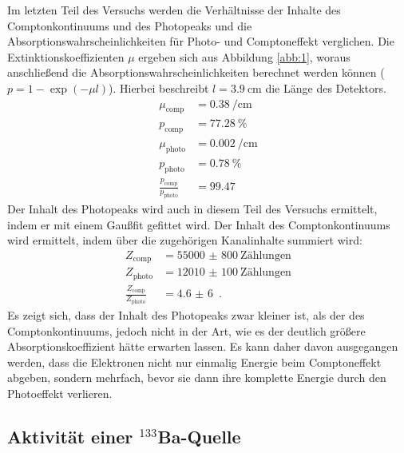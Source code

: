 \noindent Im letzten Teil des Versuchs werden die Verhältnisse der Inhalte des Comptonkontinuums und des Photopeaks und die Absorptionswahrscheinlichkeiten für Photo- und Comptoneffekt verglichen.
Die Extinktionskoeffizienten $\mu$ ergeben sich aus Abbildung \ref{abb:1}, woraus anschließend die Absorptionswahrscheinlichkeiten berechnet werden können ($p = 1-\exp(-\mu l)$). Hierbei beschreibt $l= \SI{3,9}{\centi \meter}$ die Länge des Detektors.
\begin{align*}
    \mu_{\text{comp}} &= \SI{0,38}{\per \centi \meter} \\
    p_{\text{comp}} &= \SI{77,28}{\percent}\\
    \mu_{\text{photo}} &= \SI{0,002}{\per \centi \meter} \\
    p_{\text{photo}} &= \SI{0,78}{\percent} \\
    \frac{p_{\text{comp}}}{p_{\text{photo}}} &= \SI{99,47}{}
\end{align*}
Der Inhalt des Photopeaks wird auch in diesem Teil des Versuchs ermittelt, indem er mit einem Gaußfit gefittet wird. Der Inhalt des Comptonkontinuums wird ermittelt, indem über die zugehörigen Kanalinhalte summiert wird:
\begin{align*}
    Z_{\text{comp}}  &= \SI{55000(800)}{\text{Zählungen}} \\
    Z_{\text{photo}} &= \SI{12010(100)}{\text{Zählungen}}\\
    \frac{Z_{\text{comp}}}{Z_{\text{photo}}} &= \SI{4,6(6)}{} \; .
\end{align*}
Es zeigt sich, dass der Inhalt des Photopeaks zwar kleiner ist, als der des
Comptonkontinuums, jedoch nicht in der Art, wie es der deutlich größere Absorptionskoeffizient hätte erwarten lassen.
Es kann daher davon ausgegangen werden, dass die Elektronen nicht nur einmalig Energie beim Comptoneffekt abgeben, sondern mehrfach, bevor sie dann ihre komplette Energie durch den Photoeffekt verlieren.


\subsection{Aktivität einer $^{133}$Ba-Quelle}


